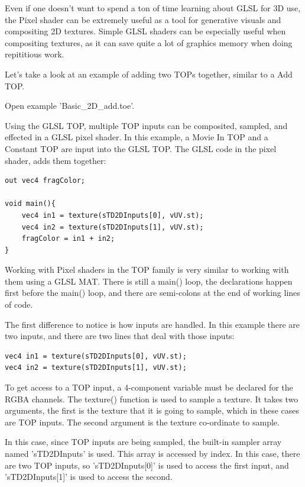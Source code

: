 \begin{fullwidth}
Even if one doesn't want to spend a ton of time learning about GLSL for 3D use, the Pixel shader can be extremely useful as a tool for generative visuals and compositing 2D textures. Simple GLSL shaders can be especially useful when compositing textures, as it can save quite a lot of graphics memory when doing repititious work.

Let's take a look at an example of adding two TOPs together, similar to a Add TOP.

Open example 'Basic\_2D\_add.toe'.

Using the GLSL TOP, multiple TOP inputs can be composited, sampled, and effected in a GLSL pixel shader. In this example, a Movie In TOP and a Constant TOP are input into the GLSL TOP. The GLSL code in the pixel shader, adds them together:

\begin{lstlisting}
out vec4 fragColor;

void main(){
	vec4 in1 = texture(sTD2DInputs[0], vUV.st);
	vec4 in2 = texture(sTD2DInputs[1], vUV.st);
	fragColor = in1 + in2;
}
\end{lstlisting}

Working with Pixel shaders in the TOP family is very similar to working with them using a GLSL MAT. There is still a main() loop, the declarations happen first before the main() loop, and there are semi-colons at the end of working lines of code.

The first difference to notice is how inputs are handled. In this example there are two inputs, and there are two lines that deal with those inputs:

\begin{lstlisting}
vec4 in1 = texture(sTD2DInputs[0], vUV.st);
vec4 in2 = texture(sTD2DInputs[1], vUV.st);
\end{lstlisting}

To get access to a TOP input, a 4-component variable must be declared for the RGBA channels. The texture() function is used to sample a texture. It takes two arguments, the first is the texture that it is going to sample, which in these cases are TOP inputs. The second argument is the texture co-ordinate to sample.

In this case, since TOP inputs are being sampled, the built-in sampler array named 'sTD2DInputs' is used. This array is accessed by index. In this case, there are two TOP inputs, so 'sTD2DInputs[0]' is used to access the first input, and 'sTD2DInputs[1]' is used to access the second. 


\end{fullwidth}
